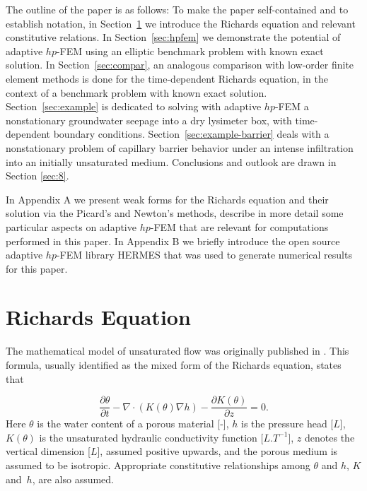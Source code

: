 \documentclass[final,3p,times,twocolumn]{elsarticle}
\begin{document}
The outline of the paper is as follows: To make the paper self-contained and to 
establish notation, in Section~\ref{sec:richards} we introduce the Richards equation and 
relevant constitutive relations. In Section~\ref{sec:hpfem} we
demonstrate the potential of adaptive $hp$-FEM using an elliptic benchmark problem with known 
exact solution. In Section~\ref{sec:compar}, an analogous comparison with low-order finite element 
methods is done for the time-dependent Richards equation, in the context of a 
benchmark problem with known exact solution. Section~\ref{sec:example} is dedicated to solving 
with adaptive $hp$-FEM a nonstationary groundwater seepage into a dry lysimeter box,
with time-dependent boundary conditions. Section~\ref{sec:example-barrier} deals with 
a nonstationary problem of capillary barrier behavior under an intense infiltration into 
an initially unsaturated medium. Conclusions and outlook are drawn in Section \ref{sec:8}.

In Appendix A we present weak forms for the Richards equation and their solution 
via the Picard's and Newton's methods, describe in more detail some particular 
aspects on adaptive 
$hp$-FEM that are relevant for computations performed in this paper. In Appendix B we
briefly introduce the open source adaptive $hp$-FEM library HERMES \cite{hermes} 
that was used to generate numerical results for this paper. 


\section{Richards Equation}
\label{sec:richards}


The mathematical model of  unsaturated flow was originally published in \cite{richards}. 
This formula, usually identified as the  mixed form of the Richards equation,  states that 

\begin{equation}
\label{mixed}
\frac{\partial \theta}{\partial t} - \nabla \cdot \left( K(\theta) \nabla h \right) - \frac{\partial K(\theta)}{\partial z} = 0.
\end{equation}
Here $\theta$ is the water content of a porous material [-], $h$ is the pressure head [$L$],  $K(\theta)$ is the unsaturated hydraulic conductivity function [$L.T^{-1}$],  $z$ denotes the 
vertical dimension [$L$], assumed positive upwards, and the porous medium is assumed to be isotropic. Appropriate  constitutive
relationships among $\theta$ and $h$, $K$ and~$h$, are also assumed.
\end{document}
